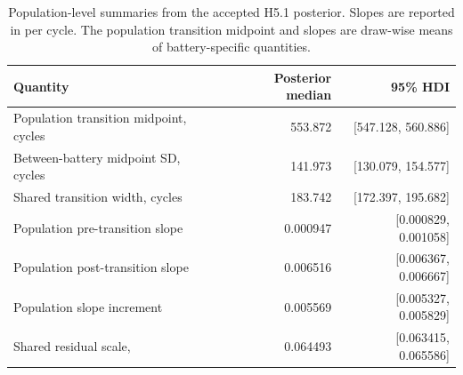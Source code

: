 \begin{table}[H]
\caption{Population-level summaries from the accepted H5.1 posterior. Slopes are reported in \CD{} per cycle. The population transition midpoint and slopes are draw-wise means of battery-specific quantities.}
\label{tab:h51-population-results}
\centering
\begin{tabularx}{\textwidth}{Xrr}
\toprule
\textbf{Quantity} & \textbf{Posterior median} & \textbf{95\% HDI}\\
\midrule
Population transition midpoint, cycles & 553.872 & [547.128, 560.886]\\
Between-battery midpoint SD, cycles & 141.973 & [130.079, 154.577]\\
Shared transition width, cycles & 183.742 & [172.397, 195.682]\\
Population pre-transition slope & 0.000947 & [0.000829, 0.001058]\\
Population post-transition slope & 0.006516 & [0.006367, 0.006667]\\
Population slope increment & 0.005569 & [0.005327, 0.005829]\\
Shared residual scale, \CD{} & 0.064493 & [0.063415, 0.065586]\\
\bottomrule
\end{tabularx}
\end{table}
